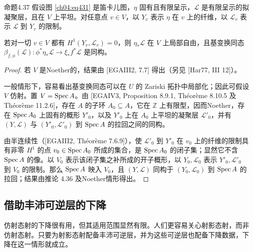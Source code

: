 \begin{origstatement}{命题}{4.37}\label{ch04:prop437}
假设图 \eqref{ch04:eq431} 是笛卡儿图，$\eta$ 固有且有限呈示，$\mathcal L$ 是有限呈示的拟凝聚层，且在 $V$ 上平坦。对任意点 $v\in V$，以 $Y_v$ 表示 $\eta$ 在 $v$ 上的纤维，以 $\mathcal L_v$ 表示 $\mathcal L$ 到 $Y_v$ 的限制。

若对一切 $v\in V$ 都有 $H^1(Y_v,\mathcal L_v)=0$，则 $\eta_*\mathcal L$ 在 $V$ 上局部自由，且基变换同态 $\beta_{f,\phi}(\mathcal L)\colon\phi^*\eta_*\mathcal L\to\xi_*f^*\mathcal L$ 是同构。
\end{origstatement}
\begin{proof}
若 $V$ 是Noether的，结果由 [EGAIII2, 7.7] 得出（另见 [Har77, III 12]）。

一般情形下，容易看出基变换同态可以在 $U$ 的 Zariski 拓扑中局部化；因此可假设 $V$ 仿射。置 $V=\operatorname{Spec} A$。由 [EGAIV3, Proposition 8.9.1, Théorème 8.10.5 及 Théorème 11.2.6]，存在 $A$ 的子环 $A_0\subseteq A$，它在 $\mathbb Z$ 上有限型，因而Noether，存在 $\operatorname{Spec} A_0$ 上固有的概形 $Y'_0$，以及 $Y'_0$ 上在 $A_0$ 上平坦的凝聚层 $\mathcal L'_0$，并有 $(Y,\mathcal L)$ 与 $(Y'_0,\mathcal L'_0)$ 到 $\operatorname{Spec} A$ 的拉回之间的同构。

由半连续性（[EGAIII2, Théorème 7.6.9]），使 $\mathcal L'_0$ 到 $Y'_0$ 在 $v_0$ 上的纤维的限制具有非零 $H^1$ 的点 $v_0\in\operatorname{Spec} A_0$ 所成的集合，是 $\operatorname{Spec} A_0$ 的闭子集；显然它不含 $\operatorname{Spec} A$ 的像。以 $V_0$
表示该闭子集之补所成的开子概形，以 $Y_0,\mathcal L_0$ 表示 $Y'_0,\mathcal L'_0$ 到 $V_0$ 的限制。那么 $\operatorname{Spec} A$ 映入 $V_0$，且 $(Y,\mathcal L)$ 同构于 $(Y_0,\mathcal L_0)$ 到 $\operatorname{Spec} A$ 的拉回；结果由推论 4.36 及Noether情形得出。
\end{proof}

\subsection{借助丰沛可逆层的下降}
仿射态射的下降很有用，但其适用范围显然有限。人们更容易关心射影态射，而非仿射态射。只要为射影态射配备丰沛可逆层，并为这些可逆层也配备下降数据，下降在这一情形就成立。

